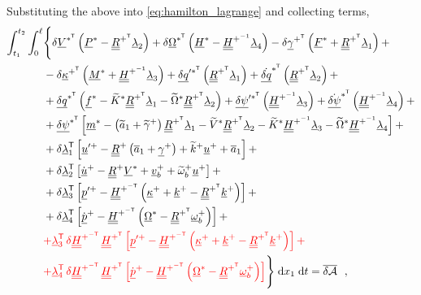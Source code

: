 \documentclass[12pt,a4paper,oneside,english]{abntex2} %
\newcommand{\fix}[1]{{\color{red}#1}}
\newcommand{\vect}[1]{\underline{#1}}
\newcommand{\uvec}[1]{\overline{#1}}
\def\tens#1{\underline{\underline{#1}}}
\def\til#1{\widetilde{#1}}
\def\lb{\left[}
\def\rb{\right]}
\def\lp{\left(}
\def\rp{\right)}
\def\T{\mathsf{T}}
\def\A{\mathcal{A}}
\def\xo{x_1}
\def\aone{\uvec{a}_1}
\def\aonetil{\til{a}_1}
\def\R{\tens{R}}
\def\Rp{\R^+}
\def\RpT{\R^{+^\T}}
\def\u{\vect{u}}
\def\uplus{\u^{+}}
\def\updot{\dot{\u}^{+}}
\def\upprime{\u^{\prime+}}
\def\vb{\vect{v}_b}
\def\vbplus{\vb^{+}}
\def\om{\vect{\omega}_b}
\def\omp{\om^{+}}
\def\omtil{\til{\omega}_b}
\def\omtilp{\omtil^{+}}
\def\gam{\vect{\gamma}}
\def\gamp{\gam^{+}}
\def\gampT{\gam^{+^\T}}
\def\gamptil{\til{\gamma}^{+}}
\def\kap{\vect{\kappa}}
\def\kapp{\kap^{+}}
\def\kappT{\kap^{+^\T}}
\def\k{\vect{k}}
\def\kp{\k^{+}}
\def\ktil{\til{k}}
\def\ktilp{\ktil^{+}}
\def\Ktil{\til{K}}
\def\Ktils{\Ktil^{*}}
\def\V{\vect{V}}
\def\Vs{\V^{*}}
\def\VsT{\V^{*^\T}}
\def\Vtils{\til{V}^{*}}
\def\Om{\vect{\Omega}}
\def\Oms{\Om^{*}}
\def\OmsT{\Om^{*^\T}}
\def\Omtil{\til{\Omega}}
\def\Omtils{\Omtil^{*}}
\def\P{\vect{P}}
\def\Ps{\P^*}
\def\Hv{\vect{H}}
\def\Hvs{\Hv^*}
\def\H{\tens{H}}
\def\HpT{\H^{+^\T}}
\def\Hpinv{\H^{+^{-1}}}
\def\HpmT{\H^{+^{-\T}}}
\def\p{\vect{p}}
\def\pdot{\dot{\p}}
\def\ppdot{\pdot^{+}}
\def\ppprime{\p^{\prime{+}}}
\def\F{\vect{F}}
\def\Fs{\F^*}
\def\M{\vect{M}}
\def\Ms{\M^*}
\def\f{\vect{f}}
\def\fs{\f^*}
\def\m{\vect{m}}
\def\ms{\m^*}
\def\delq{\vect{\delta q}}
\def\delqdotsT{\dot{\delq}^{*^\T}}
\def\delqsT{\delq^{*^\T}}
\def\delqpsT{\delq^{{\prime*}^\T}}
\def\delpsi{\vect{\delta\psi}}
\def\delpsisT{\delpsi^{*^\T}}
\def\delpsipsT{\delpsi^{\prime*^\T}}
\def\delpsidot{\dot{\delpsi}}
\def\delpsisdotT{\delpsidot^{*^\T}}
\def\lamb{\vect{\lambda}}
\def\intt{\int_{t_1}^{t_2}}
\def\intl{\int_{0}^{\ell}}
\def\d{\textnormal{d}}
\begin{document}
Substituting the above into \cref{eq:hamilton_lagrange} and collecting terms,
\begin{align}
    \intt\intl &\Biggl\{\Biggr. \delta\VsT\lp\Ps-\RpT\lamb_2\rp + \delta\OmsT\lp\Hvs-\Hpinv\lamb_4\rp - \delta\gampT\lp\Fs+\RpT\lamb_1\rp + 
    \nonumber \\
    &-\delta\kappT\lp\Ms+\Hpinv\lamb_3\rp + \delqpsT\lp\RpT\lamb_1\rp + \delqdotsT\lp\RpT\lamb_2\rp + 
    \nonumber \\
    &+\delqsT\lp\fs-\Ktils\RpT\lamb_1-\Omtils\RpT\lamb_2\rp +\delpsipsT\lp\Hpinv\lamb_3\rp+\delpsisdotT\lp\Hpinv\lamb_4\rp + 
    \nonumber \\
    &+\delpsisT\lb\ms-\lp\aonetil+\gamptil\rp\RpT\lamb_1-\Vtils\RpT\lamb_2-\Ktils\Hpinv\lamb_3-\Omtils\Hpinv\lamb_4\rb + 
    \nonumber \\ 
    &+\delta\lamb_1^\T\lb\upprime-\Rp\lp\aone+\gamp\rp+\ktilp\uplus+\aone\rb + \nonumber \\ 
    &+ \delta\lamb_2^\T\lb\updot-\Rp\Vs+\vbplus+\omtilp\uplus\rb + 
    \nonumber \\
    &+\delta\lamb_3^\T\lb\ppprime-\HpmT\lp\kapp+\kp-\RpT\kp\rp\rb + 
    \nonumber \\ 
    &+\delta\lamb_4^\T\lb\ppdot-\HpmT\lp\Oms-\RpT\omp\rp\rb + 
    \nonumber \\ 
    &\fix{+\lamb_3^\T\,\delta\HpmT\,\HpT\lb\ppprime-\HpmT\lp\kapp+\kp-\RpT\kp\rp\rb +} \nonumber \\
    &\fix{+ \lamb_4^\T\,\delta\HpmT\,\HpT\lb\ppdot-\HpmT\lp\Oms-\RpT\omp\rp\rb}
    \Biggl.\Biggr\}\;\d \xo\;\d t = \overline{\delta\A} \ \ ,
    \label{eq:hamilton_lagrange2}
\end{align}
\end{document}
